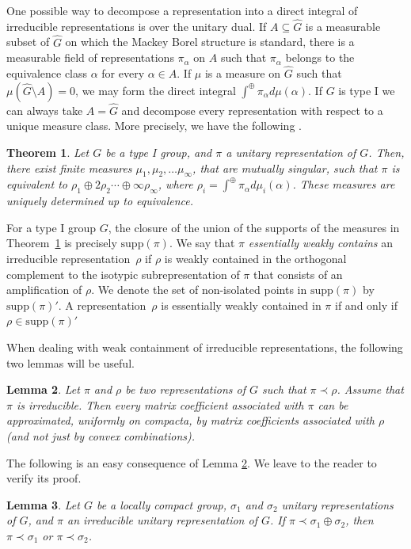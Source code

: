 \documentclass[12pt,reqno]{amsart}
\newtheorem{theorem}{Theorem}[section]
\newtheorem{lemma}[theorem]{Lemma}
\theoremstyle{definition}
\begin{document}
One possible way to decompose a representation into a direct integral of irreducible representations is over the unitary dual. If $A \subseteq \widehat{G}$ is a measurable subset of $\widehat{G}$ on which the Mackey Borel structure is standard, there is a measurable field of representations $\pi_\alpha$ on $A$ such that $\pi_\alpha$ belongs to the equivalence class $\alpha$ for every $\alpha \in A$. If $\mu$ is a measure on $\widehat{G}$ such that $\mu(\widehat{G}\setminus A)=0$, we may form the direct integral $\int^\oplus\pi_\alpha d\mu(\alpha)$. If $G$ is type I we can always take $A=\widehat{G}$ and decompose every representation with respect to a unique measure class. More precisely, we have the following \cite[Theorem~7.32]{Folland}.
\begin{theorem}\label{thm:type I groups}
    Let $G$ be a type I group, and $\pi$ a unitary representation of $G$. Then, there exist finite measures $\mu_1,\mu_2,\dots\mu_\infty$, that are mutually singular, such that $\pi$ is equivalent to $\rho_1 \oplus 2\rho_2 \cdots \oplus \infty \rho_\infty$, where $\rho_i = \int^\oplus\pi_\alpha d\mu_i(\alpha)$. These measures are uniquely determined up to equivalence.
\end{theorem}
For a type I group $G$, the closure of the union of the supports of the measures in Theorem~\ref{thm:type I groups} is precisely $\mathrm{supp}(\pi)$. We say that $\pi$ \emph{essentially weakly contains} an irreducible representation~$\rho$ if $\rho$ is weakly contained in the orthogonal complement to the isotypic subrepresentation of $\pi$ that consists of an amplification of $\rho$. We denote the set of non-isolated points in $\mathrm{supp}(\pi)$ by $\mathrm{supp}(\pi)'$. A representation~$\rho$ is essentially weakly contained in $\pi$ if and only if $\rho \in \mathrm{supp}(\pi)'$

When dealing with weak containment of irreducible representations, the following two lemmas will be useful.
\begin{lemma}\cite[Proposition~F.1.4]{bdlv}\label{lem:irred rep weak cont}
    Let $\pi$ and $\rho$ be two representations of $G$ such that $\pi \prec \rho$. Assume that $\pi$ is irreducible. Then every matrix coefficient associated with $\pi$ can be approximated, uniformly on compacta, by matrix coefficients associated with $\rho$ (and not just by convex combinations).
\end{lemma}
The following is an easy consequence of Lemma \ref{lem:irred rep weak cont}. We leave to the reader to verify its proof.
\begin{lemma}\label{weakContain}
    Let $G$ be a locally compact group, $\sigma_1$ and $\sigma_2$ unitary representations of $G$, and $\pi$ an irreducible unitary representation of $G$. If $\pi \prec \sigma_1 \oplus \sigma_2$, then $\pi \prec \sigma_1$ or $\pi \prec \sigma_2$.
\end{lemma}
\end{document}
